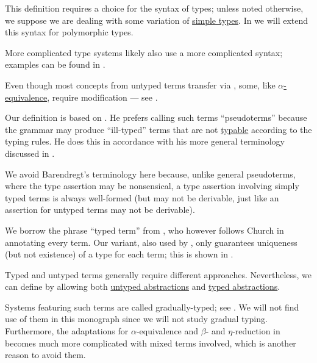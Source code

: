\begin{comments}
  \item This definition requires a choice for the syntax of types; unless noted otherwise, we suppose we are dealing with some variation of \hyperref[def:simple_type]{simple types}. In  we will extend this syntax for polymorphic types.

  More complicated type systems likely also use a more complicated syntax; examples can be found in .

  \item Even though most concepts from untyped terms transfer via , some, like \hyperref[def:lambda_term_alpha_equivalence]{\( \alpha \)-equivalence}, require modification --- see .

  \item Our definition is based on . He prefers calling such terms \enquote{pseudoterms} because the grammar may produce \enquote{ill-typed} terms that are not \hyperref[def:typability]{typable} according to the typing rules. He does this in accordance with his more general terminology discussed in .

  We avoid Barendregt's terminology here because, unlike general pseudoterms, where the type assertion may be nonsensical, a type assertion involving simply typed terms is always well-formed (but may not be derivable, just like an assertion for untyped terms may not be derivable).

  We borrow the phrase \enquote{typed term} from , who however follows Church in annotating every term. Our variant, also used by , only guarantees uniqueness (but not existence) of a type for each term; this is shown in .
\end{comments}

\begin{remark}\label{rem:mixed_lambda_term}\mimprovised
  Typed and untyped terms generally require different approaches. Nevertheless, we can define  by allowing both \hyperref[def:lambda_term]{untyped abstractions} and \hyperref[def:typed_lambda_term]{typed abstractions}.

  Systems featuring such terms are called gradually-typed; see . We will not find use of them in this monograph since we will not study gradual typing. Furthermore, the adaptations for \( \alpha \)-equivalence and \( \beta \)- and \( \eta \)-reduction in  becomes much more complicated with mixed terms involved, which is another reason to avoid them.
\end{remark}

